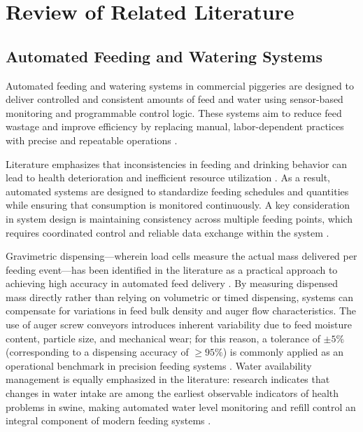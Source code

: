 \section{Review of Related Literature}

\subsection{Automated Feeding and Watering Systems}

Automated feeding and watering systems in commercial piggeries are designed to deliver controlled and consistent amounts of feed and water using sensor-based monitoring and programmable control logic. These systems aim to reduce feed wastage and improve efficiency by replacing manual, labor-dependent practices with precise and repeatable operations \cite{adeoye2025animalia, beyondtech2025smart, arguta2024iop, dambaulova2023benefits}.

Literature emphasizes that inconsistencies in feeding and drinking behavior can lead to health deterioration and inefficient resource utilization \cite{oecdfao2025outlook, livestockproduction2026, derouchey2010feeding}. As a result, automated systems are designed to standardize feeding schedules and quantities while ensuring that consumption is monitored continuously. A key consideration in system design is maintaining consistency across multiple feeding points, which requires coordinated control and reliable data exchange within the system \cite{arguta2024iop, dambaulova2023benefits}.

Gravimetric dispensing---wherein load cells measure the actual mass delivered per feeding event---has been identified in the literature as a practical approach to achieving high accuracy in automated feed delivery \cite{tangorra2018energy, dambaulova2023benefits}. By measuring dispensed mass directly rather than relying on volumetric or timed dispensing, systems can compensate for variations in feed bulk density and auger flow characteristics. The use of auger screw conveyors introduces inherent variability due to feed moisture content, particle size, and mechanical wear; for this reason, a tolerance of $\pm 5\%$ (corresponding to a dispensing accuracy of $\geq 95\%$) is commonly applied as an operational benchmark in precision feeding systems \cite{tangorra2018energy, adeoye2025animalia}. Water availability management is equally emphasized in the literature: research indicates that changes in water intake are among the earliest observable indicators of health problems in swine, making automated water level monitoring and refill control an integral component of modern feeding systems \cite{whitney2018water, samuel2025water, derouchey2010feeding}.

